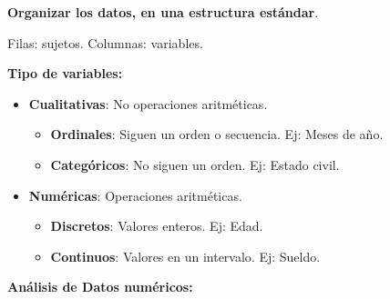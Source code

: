 \documentclass[12pt]{report} %
\begin{document}
\textbf{Organizar los datos, en una estructura estándar}.

Filas: sujetos. Columnas: variables.

\textbf{Tipo de variables:}

\begin{itemize}

\item
  \textbf{Cualitativas}: No operaciones aritméticas.

  \begin{itemize}
  
  \item
    \textbf{Ordinales}: Siguen un orden o secuencia. Ej: Meses de año.
  \item
    \textbf{Categóricos}: No siguen un orden. Ej: Estado civil.
  \end{itemize}
\item
  \textbf{Numéricas}: Operaciones aritméticas.

  \begin{itemize}
  
  \item
    \textbf{Discretos}: Valores enteros. Ej: Edad.
  \item
    \textbf{Continuos}: Valores en un intervalo. Ej: Sueldo.
  \end{itemize}
\end{itemize}

\textbf{Análisis de Datos numéricos:}
\end{document}

